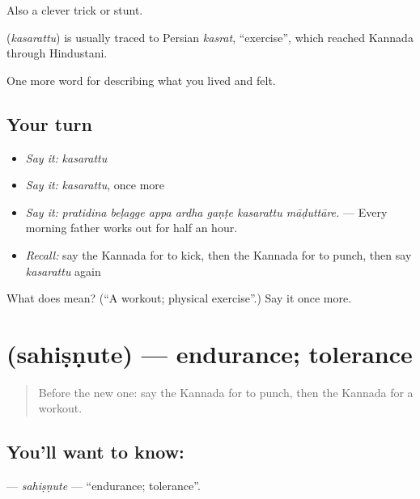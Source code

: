 Also a clever trick or stunt.

\begin{cousinweb}
\textbf{} (\emph{kasarattu}) is usually traced to Persian \emph{kasrat}, \textquotedblleft{}exercise\textquotedblright{}, which reached Kannada through Hindustani.
\end{cousinweb}

\begin{grammarlens}[title={What you've built}]
One more word for describing what you lived and felt.
\end{grammarlens}

\subsection*{Your turn}
\begin{itemize}
\raggedright
  \item \emph{Say it:} \emph{kasarattu}
  \item \emph{Say it:} \emph{kasarattu}, once more
  \item \emph{Say it:} \emph{pratidina beḷagge appa ardha gaṇṭe kasarattu māḍuttāre.} — Every morning father works out for half an hour.
  \item \emph{Recall:} say the Kannada for to kick, then the Kannada for to punch, then say \emph{kasarattu} again
\end{itemize}

\begin{tcolorbox}[breakable,colback=teal!4,colframe=teal!35!black,title={Before you move on}]
What does  mean? (\textquotedblleft{}A workout; physical exercise\textquotedblright{}.) Say it once more.
\end{tcolorbox}
\section[\texorpdfstring{\kn{ಸಹಿಷ್ಣುತೆ} (sahiṣṇute)}{ಸಹಿಷ್ಣುತೆ (sahiṣṇute)}]{ (sahiṣṇute) — endurance; tolerance}

\label{lesson:KA-C541-sahisnute}



\begin{quote}
Before the new one: say the Kannada for to punch, then the Kannada for a workout.
\end{quote}

\subsection*{You'll want to know: }
\textbf{} — \emph{sahiṣṇute} — \textquotedblleft{}endurance; tolerance\textquotedblright{}.

